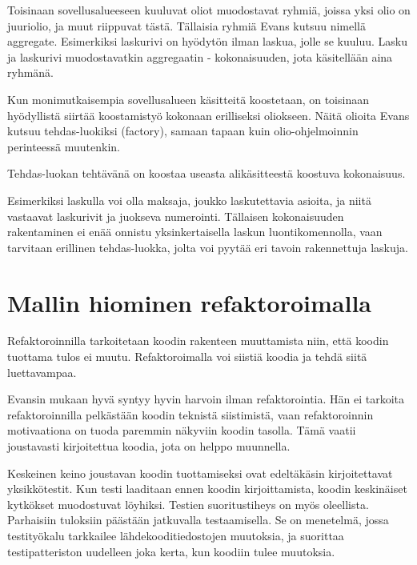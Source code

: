Toisinaan sovellusalueeseen kuuluvat oliot muodostavat ryhmiä, joissa
yksi olio on juuriolio, ja muut riippuvat tästä. Tällaisia ryhmiä Evans
kutsuu nimellä \gls{aggregate}. Esimerkiksi laskurivi on hyödytön ilman
laskua, jolle se kuuluu. Lasku ja laskurivi muodostavatkin aggregaatin -
kokonaisuuden, jota käsitellään aina ryhmänä.

Kun monimutkaisempia sovellusalueen käsitteitä koostetaan, on toisinaan
hyödyllistä siirtää koostamistyö kokonaan erilliseksi oliokseen. Näitä
olioita Evans kutsuu tehdas-luokiksi (factory), samaan tapaan kuin
olio-ohjelmoinnin perinteessä muutenkin.

Tehdas-luokan tehtävänä on koostaa useasta alikäsitteestä koostuva
kokonaisuus.

Esimerkiksi laskulla voi olla maksaja, joukko laskutettavia asioita, ja
niitä vastaavat laskurivit ja juokseva numerointi. Tällaisen
kokonaisuuden rakentaminen ei enää onnistu yksinkertaisella laskun
luontikomennolla, vaan tarvitaan erillinen tehdas-luokka, jolta voi
pyytää eri tavoin rakennettuja laskuja.

\hypertarget{mallin-hiominen-refaktoroimalla}{%
\section{Mallin hiominen
refaktoroimalla}\label{mallin-hiominen-refaktoroimalla}}

Refaktoroinnilla tarkoitetaan koodin rakenteen muuttamista niin, että
koodin tuottama tulos ei muutu. Refaktoroimalla voi siistiä koodia ja
tehdä siitä luettavampaa.

Evansin mukaan hyvä  syntyy hyvin harvoin
ilman refaktorointia. Hän ei tarkoita refaktoroinnilla pelkästään koodin
teknistä siistimistä, vaan refaktoroinnin motivaationa on tuoda
 paremmin näkyviin koodin tasolla. Tämä vaatii
joustavasti kirjoitettua koodia, jota on helppo
muunnella.\cite[osa 3.]{evans:ddd}

Keskeinen keino joustavan koodin tuottamiseksi ovat edeltäkäsin
kirjoitettavat yksikkötestit. Kun testi laaditaan ennen koodin
kirjoittamista, koodin keskinäiset kytkökset muodostuvat löyhiksi.
Testien suoritustiheys on myös oleellista. Parhaisiin tuloksiin päästään
jatkuvalla testaamisella. Se on menetelmä, jossa testityökalu tarkkailee
lähdekooditiedostojen muutoksia, ja suorittaa testipatteriston uudelleen
joka kerta, kun koodiin tulee muutoksia. \cite[luku 6]{beck2004extreme}

